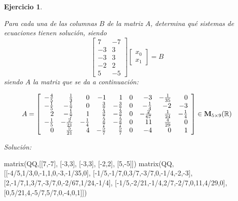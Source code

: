 \documentclass[12pt]{amsart}
\newtheorem{ejer}{Ejercicio}
\begin{document}
\begin{ejer}
\noindent\begin{minipage}{\textwidth} 
\begin{tcolorbox}[colback = red!20!white,title=Versión Ecuaciones Implícitas]
Para cada una de las columnas $B$ de la matriz $A$, determina qué sistemas de ecuaciones tienen solución, siendo $$ \left[\begin{array}{rr}
7 & -7 \\
-3 & 3 \\
-3 & 3 \\
-2 & 2 \\
5 & -5
\end{array}\right] \left[\begin{array}{r}
x_{0} \\
x_{1}
\end{array}\right] = B$$ siendo $A$ la matriz que se da a continuación:
\end{tcolorbox}
\end{minipage}
\[ A = \left[\begin{array}{rrrrrrrrr}
-\frac{4}{5} & \frac{1}{3} & 0 & -1 & 1 & 0 & -3 & -\frac{1}{35} & 0 \\
-\frac{1}{5} & -\frac{1}{7} & 0 & \frac{3}{7} & -\frac{3}{7} & 0 & -\frac{1}{4} & -2 & -3 \\
2 & -\frac{1}{7} & 1 & \frac{3}{7} & -\frac{3}{7} & 0 & -\frac{2}{67} & \frac{1}{24} & -\frac{1}{4} \\
-\frac{1}{5} & -\frac{2}{21} & -\frac{1}{4} & \frac{2}{7} & -\frac{2}{7} & 0 & 11 & \frac{4}{29} & 0 \\
0 & \frac{5}{21} & 4 & -\frac{5}{7} & \frac{5}{7} & 0 & -4 & 0 & 1
\end{array}\right] \in {\bf M}_{5\times 9}({\mathbb R})\]
\end{ejer}

{\it Soluci\'on:}

\begin{sageblock}
matrix(QQ,[[7,-7],
[-3,3],
[-3,3],
[-2,2],
[5,-5]])
matrix(QQ,[[-4/5,1/3,0,-1,1,0,-3,-1/35,0],
[-1/5,-1/7,0,3/7,-3/7,0,-1/4,-2,-3],
[2,-1/7,1,3/7,-3/7,0,-2/67,1/24,-1/4],
[-1/5,-2/21,-1/4,2/7,-2/7,0,11,4/29,0],
[0,5/21,4,-5/7,5/7,0,-4,0,1]])
\end{sageblock}

\end{document}
